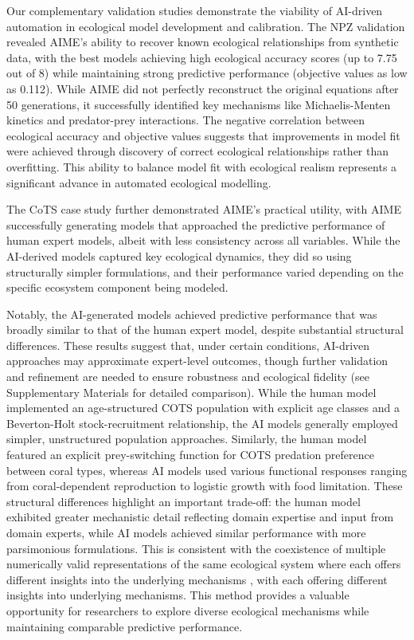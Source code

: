 Our complementary validation studies demonstrate the viability of AI-driven automation in ecological model development and calibration. The NPZ validation revealed AIME's ability to recover known ecological relationships from synthetic data, with the best models achieving high ecological accuracy scores (up to 7.75 out of 8) while maintaining strong predictive performance (objective values as low as 0.112). While AIME did not perfectly reconstruct the original equations after 50 generations, it successfully identified key mechanisms like Michaelis-Menten kinetics and predator-prey interactions. The negative correlation between ecological accuracy and objective values suggests that improvements in model fit were achieved through discovery of correct ecological relationships rather than overfitting. This ability to balance model fit with ecological realism represents a significant advance in automated ecological modelling.

The CoTS case study further demonstrated AIME's practical utility, with AIME successfully generating models that approached the predictive performance of human expert models, albeit with less consistency across all variables. While the AI-derived models captured key ecological dynamics, they did so using structurally simpler formulations, and their performance varied depending on the specific ecosystem component being modeled.

Notably, the AI-generated models achieved predictive performance that was broadly similar to that of the human expert model, despite substantial structural differences. These results suggest that, under certain conditions, AI-driven approaches may approximate expert-level outcomes, though further validation and refinement are needed to ensure robustness and ecological fidelity (see Supplementary Materials for detailed comparison). While the human model implemented an age-structured COTS population with explicit age classes and a Beverton-Holt stock-recruitment relationship, the AI models generally employed simpler, unstructured population approaches. Similarly, the human model featured an explicit prey-switching function for COTS predation preference between coral types, whereas AI models used various functional responses ranging from coral-dependent reproduction to logistic growth with food limitation. These structural differences highlight an important trade-off: the human model exhibited greater mechanistic detail reflecting domain expertise and input from domain experts, while AI models achieved similar performance with more parsimonious formulations. This is consistent with the coexistence of multiple numerically valid representations of the same
ecological system where each offers different insights into the underlying mechanisms \citep{patterson2001estimating}, with each offering different insights into underlying mechanisms. This method provides a valuable opportunity for researchers to explore diverse ecological mechanisms while maintaining comparable predictive performance.

